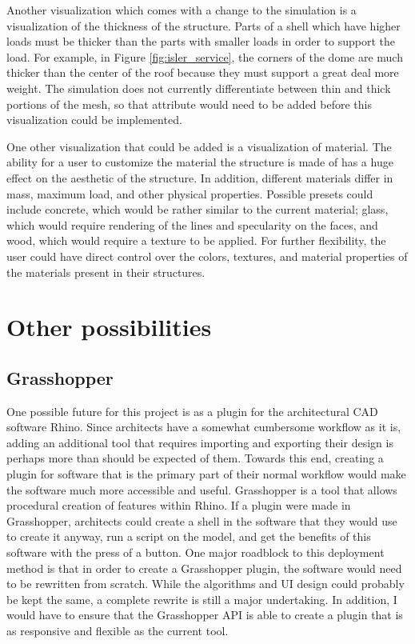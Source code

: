\documentclass{thesis}
\begin{document}
Another visualization which comes with a change to the simulation is a visualization of the thickness of the structure.  Parts
of a shell which have higher loads must be thicker than the parts with smaller loads in order to support the load.  For example,
in Figure \ref{fig:isler_service}, the corners of the dome are much thicker than the center of the roof because they must support
a great deal more weight.  The simulation does not currently differentiate between thin and thick portions of the mesh, so that
attribute would need to be added before this visualization could be implemented.

One other visualization that could be added is a visualization of material.  The ability for a user to customize the material the
structure is made of has a huge effect on the aesthetic of the structure.  In addition, different materials differ in mass,
maximum load, and other physical properties.  Possible presets could include concrete, which would be
rather similar to the current material; glass, which would require rendering of the lines and specularity on the faces, and wood,
which would require a texture to be applied.  For further flexibility, the user could have direct control over the colors, textures,
and material properties of the materials present in their structures.

\section{Other possibilities}

\subsection{Grasshopper}
One possible future for this project is as a plugin for the architectural CAD software Rhino\cite{rhino}.  Since architects
have a somewhat cumbersome workflow as it is, adding an additional tool that requires importing and exporting their design
is perhaps more than should be expected of them.  Towards this end, creating a plugin for software that is the primary part
of their normal workflow would make the software much more accessible and useful.  Grasshopper\cite{grasshopper} is a tool
that allows procedural creation of features within Rhino.  If a plugin were made in Grasshopper, architects could create a
shell in the software that they would use to create it anyway, run a script on the model, and get the benefits of this
software with the press of a button.  One major roadblock to this deployment method is that in order to create a Grasshopper
plugin, the software would need to be rewritten from scratch.  While the algorithms and UI design could probably be kept the
same, a complete rewrite is still a major undertaking.  In addition, I would have to ensure that the Grasshopper API is
able to create a plugin that is as responsive and flexible as the current tool.
\end{document}
